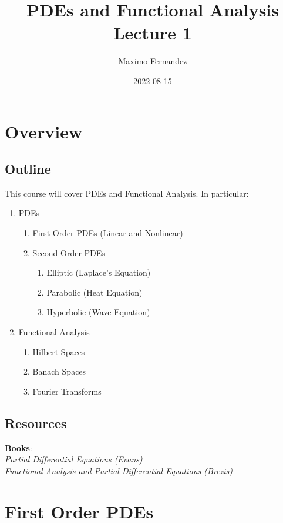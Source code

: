 \documentclass[12pt]{article}
\author{Maximo Fernandez}
\title{PDEs and Functional Analysis\\ Lecture 1}
\date{
    2022-08-15
}
\begin{document}
\maketitle
\section{Overview}
\label{sec:overview}
\subsection{Outline}
\label{sub:outline}
This course will cover PDEs and Functional Analysis. In particular:
\begin{enumerate}
    \item PDEs
    \begin{enumerate}
        \item First Order PDEs (Linear and Nonlinear)
        \item Second Order PDEs
        \begin{enumerate}
            \item Elliptic (Laplace's Equation)
            \item Parabolic (Heat Equation)
            \item Hyperbolic (Wave Equation)
        \end{enumerate}
    \end{enumerate}
    \item Functional Analysis
        \begin{enumerate}
            \item Hilbert Spaces
            \item Banach Spaces
            \item Fourier Transforms
        \end{enumerate}
\end{enumerate}
\subsection{Resources}
\label{sub:resources}
\textbf{Books}:
\\
\emph{Partial Differential Equations (Evans)}
\\
\emph{Functional Analysis and Partial Differential Equations (Brezis)}

\pagebreak
\section{First Order PDEs}
\label{sec:first_order_pdes}
\end{document}
